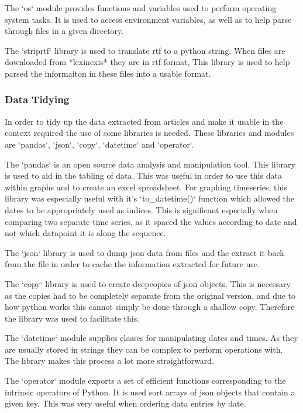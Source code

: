 The `os` module provides functions and variables used to perform operating system tasks. It is used to access environment variables, as well as to help parse through files in a given directory.

The `striprtf` library is used to translate rtf to a python string. When files are downloaded from *lexinexis* they are in rtf format, This library is used to help parsed the informaiton in these files into a usable format.

\subsubsection{Data Tidying}

In order to tidy up the data extracted from articles and make it usable in the context required the use of some libraries is needed. These libraries and modules are `pandas`, `json`, `copy`, `datetime` and `operator`.

The `pandas` is an open source data analysis and manipulation tool. This library is used to aid in the tabling of data. This was useful in order to use this data within graphs and to create an excel spreadsheet. For graphing timeseries, this library was especially useful with it's `to_datetime()` function which allowed the dates to be appropriately used as indices. This is significant especially when comparing two separate time series, as it spaced the values according to date and not which datapoint it is along the sequence.

The `json` library is used to dump json data from files and the extract it back from the file in order to cache the information extracted for future use.

The `copy` library is used to create deepcopies of json objects. This is necessary as the copies had to be completely separate from the original version, and due to how python works this cannot simply be done through a shallow copy. Therefore the library was used to facilitate this.

The `datetime` module supplies classes for manipulating dates and times. As they are usually stored in strings they can be complex to perform operations with. The library makes this process a lot more straightforward.

The `operator` module exports a set of efficient functions corresponding to the intrinsic operators of Python. It is used sort arrays of json objects that contain a given key. This was very useful when ordering data entries by date.

